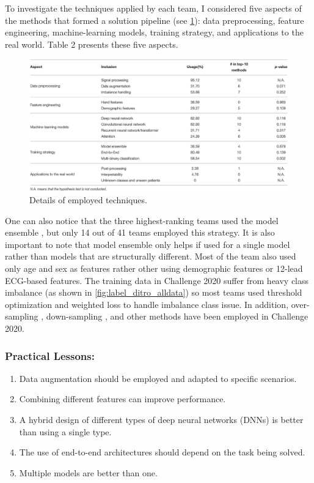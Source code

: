 To investigate the techniques applied by each team, I considered five aspects of the methods that formed a solution pipeline (see \ref{fig:meta_analysis_2020_teams}): data preprocessing, feature engineering, machine-learning models, training strategy, and applications to the real world. Table 2 presents these five aspects.


\begin{figure}[H]
\centering
\includegraphics[scale=0.32]{img/meta_analysis_2020_teams.jpeg}
\caption{Details of employed techniques.}
\label{fig:meta_analysis_2020_teams}
\end{figure}


\cite{main_arythmia_detection} One can also notice that the three highest-ranking teams used the model ensemble \cite{first_team, second_team, third_team}, but only 14 out of 41 teams employed this strategy. It is also important to note that model ensemble only helps if used for a single model rather than models that are structurally different. Most of the team also used only age and sex as features rather other using demographic features or 12-lead ECG-based features. The training data in Challenge 2020 suffer from heavy class imbalance (as shown in \ref{fig:label_ditro_alldata}) so most teams used  threshold optimization \cite{eighth_team, second_team, ninth_team} and weighted loss \cite{sixth_team, seventh_team} to handle imbalance class issue. In addition, over-sampling \cite{thirteen_team}, down-sampling \cite{sixteen_team}, and other methods have been employed in Challenge 2020.

\subsubsection{Practical Lessons:}

\begin{enumerate}
  \item Data augmentation should be employed and adapted to specific scenarios.
  \item Combining different features can improve performance.
  \item A hybrid design of different types of deep neural networks (DNNs) is better than using a single type.
   \item The use of end-to-end architectures should depend on the task being solved.
   \item Multiple models are better than one.
\end{enumerate}

